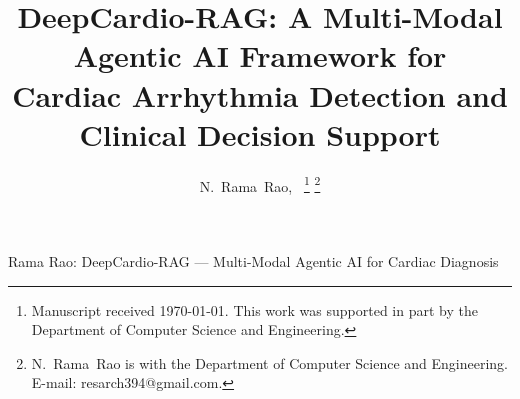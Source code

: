 \documentclass[journal,10pt,twoside]{IEEEtran}
\begin{document}
\title{DeepCardio-RAG: A Multi-Modal Agentic AI Framework for\\
       Cardiac Arrhythmia Detection and Clinical Decision Support}

\author{N.~Rama~Rao,~%
\thanks{Manuscript received \today. This work was supported in part by the
        Department of Computer Science and Engineering.}%
\thanks{N.~Rama~Rao is with the Department of Computer Science and Engineering.
        E-mail: resarch394@gmail.com.}}

%
{Rama Rao: DeepCardio-RAG — Multi-Modal Agentic AI for Cardiac Diagnosis}

\maketitle
\end{document}
